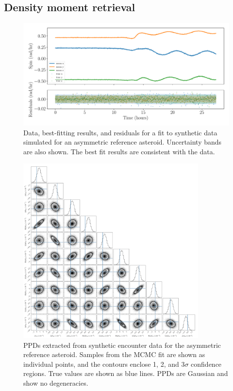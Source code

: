 \documentclass[fleqn,usenatbib]{mnras}
\begin{document}
\subsection{Density moment retrieval}
\label{sec:results-moment}
\begin{figure}
  \centering
  \includegraphics[width=\linewidth]{figs/example-residuals.pdf}
  \caption{Data, best-fitting results, and residuals for a fit to synthetic data simulated for an asymmetric reference asteroid. Uncertainty bands are also shown. The best fit results are consistent with the data.}
  \label{fig:example-residuals}
\end{figure}

\begin{figure}
  \centering
  \includegraphics[width=0.85\textwidth]{figs/example-corner.png}
  \caption{PPDs extracted from synthetic encounter data for the asymmetric reference asteroid. Samples from the MCMC fit are shown as individual points, and the contours enclose 1, 2, and 3$\sigma$ confidence regions. True values are shown as blue lines. PPDs are Gaussian and show no degeneracies.}
  \label{fig:example-corner}
\end{figure}
\end{document}
